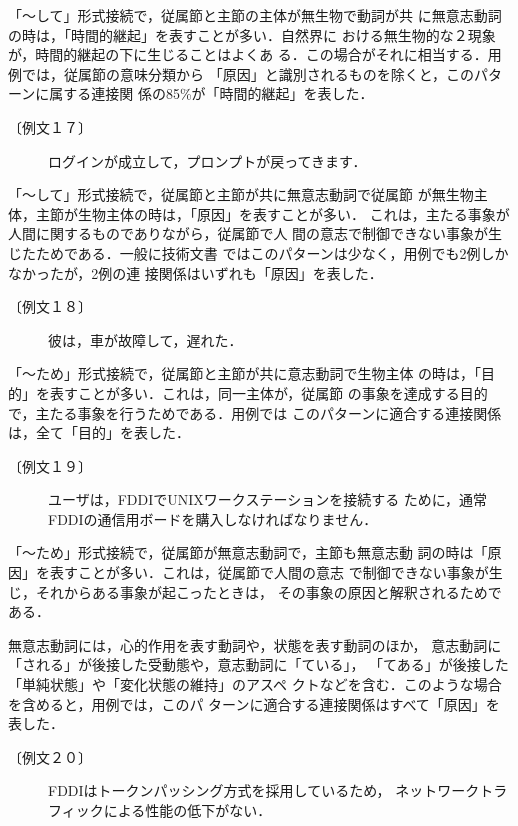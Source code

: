 「〜して」形式接続で，従属節と主節の主体が無生物で動詞が共
に無意志動詞の時は，「時間的継起」を表すことが多い．自然界に
おける無生物的な２現象が，時間的継起の下に生じることはよくあ
る．この場合がそれに相当する．用例では，従属節の意味分類から
「原因」と識別されるものを除くと，このパターンに属する連接関
係の85\%が「時間的継起」を表した．
\begin{description}
\item[〔例文１７〕] ログインが成立して，プロンプトが戻ってきます．
\end{description}

「〜して」形式接続で，従属節と主節が共に無意志動詞で従属節
が無生物主体，主節が生物主体の時は，「原因」を表すことが多い．
これは，主たる事象が人間に関するものでありながら，従属節で人
間の意志で制御できない事象が生じたためである．一般に技術文書
ではこのパターンは少なく，用例でも2例しかなかったが，2例の連
接関係はいずれも「原因」を表した．
\begin{description}
\item[〔例文１８〕] 彼は，車が故障して，遅れた．
\end{description}

「〜ため」形式接続で，従属節と主節が共に意志動詞で生物主体
の時は，「目的」を表すことが多い．これは，同一主体が，従属節
の事象を達成する目的で，主たる事象を行うためである．用例では
このパターンに適合する連接関係は，全て「目的」を表した．
\begin{description}
\item[〔例文１９〕] ユーザは，FDDIでUNIXワークステーションを接続する
ために，通常FDDIの通信用ボードを購入しなければなりません．
\end{description}

「〜ため」形式接続で，従属節が無意志動詞で，主節も無意志動
詞の時は「原因」を表すことが多い．これは，従属節で人間の意志
で制御できない事象が生じ，それからある事象が起こったときは，
その事象の原因と解釈されるためである．

無意志動詞には，心的作用を表す動詞や，状態を表す動詞のほか，
意志動詞に「される」が後接した受動態や，意志動詞に「ている」，
「てある」が後接した「単純状態」や「変化状態の維持」のアスペ
クトなどを含む．このような場合を含めると，用例では，このパ
ターンに適合する連接関係はすべて「原因」を表した．
\begin{description}
\item[〔例文２０〕] FDDIはトークンパッシング方式を採用しているため，
ネットワークトラフィックによる性能の低下がない．
\end{description}

